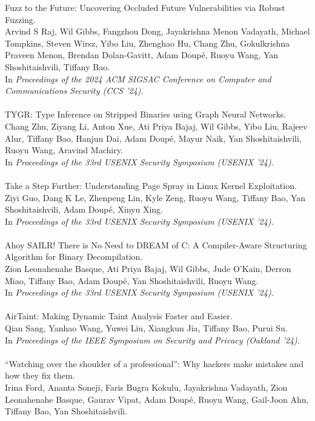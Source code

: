 Fuzz to the Future: Uncovering Occluded Future Vulnerabilities via Robust Fuzzing. \\
Arvind S Raj, Wil Gibbs, Fangzhou Dong, Jayakrishna Menon Vadayath, Michael Tompkins, Steven Wirsz, Yibo Liu, Zhenghao Hu, Chang Zhu, Gokulkrishna Praveen Menon, Brendan Dolan-Gavitt, Adam Doup\'{e}, Ruoyu Wang, Yan Shoshitaishvili, Tiffany Bao. \\
In \emph{Proceedings of the 2024 ACM SIGSAC Conference on Computer and Communications Security (CCS '24)}.
\\\\
TYGR: Type Inference on Stripped Binaries using Graph Neural Networks. \\
Chang Zhu, Ziyang Li, Anton Xue, Ati Priya Bajaj, Wil Gibbs, Yibo Liu, Rajeev Alur, Tiffany Bao, Hanjun Dai, Adam Doup\'{e}, Mayur Naik, Yan Shoshitaishvili, Ruoyu Wang, Aravind Machiry. \\
In \emph{Proceedings of the 33rd USENIX Security Symposium (USENIX '24)}.
\\\\
Take a Step Further: Understanding Page Spray in Linux Kernel Exploitation. \\
Ziyi Guo, Dang K Le, Zhenpeng Lin, Kyle Zeng, Ruoyu Wang, Tiffany Bao, Yan Shoshitaishvili, Adam Doup\'{e}, Xinyu Xing. \\
In \emph{Proceedings of the 33rd USENIX Security Symposium (USENIX '24)}.
\\\\
Ahoy SAILR! There is No Need to DREAM of C: A Compiler-Aware Structuring Algorithm for Binary Decompilation. \\
Zion Leonahenahe Basque, Ati Priya Bajaj, Wil Gibbs, Jude O'Kain, Derron Miao, Tiffany Bao, Adam Doup\'{e}, Yan Shoshitaishvili, Ruoyu Wang. \\
In \emph{Proceedings of the 33rd USENIX Security Symposium (USENIX '24)}.
\\\\
AirTaint: Making Dynamic Taint Analysis Faster and Easier. \\
Qian Sang, Yanhao Wang, Yuwei Liu, Xiangkun Jia, Tiffany Bao, Purui Su. \\
In \emph{Proceedings of the IEEE Symposium on Security and Privacy (Oakland '24)}.
\\\\
“Watching over the shoulder of a professional”: Why hackers make mistakes and how they fix them. \\
Irina Ford, Ananta Soneji, Faris Bugra Kokulu, Jayakrishna Vadayath, Zion Leonahenahe Basque, Gaurav Vipat, Adam Doup\'{e}, Ruoyu Wang, Gail-Joon Ahn, Tiffany Bao, Yan Shoshitaishvili. \\
